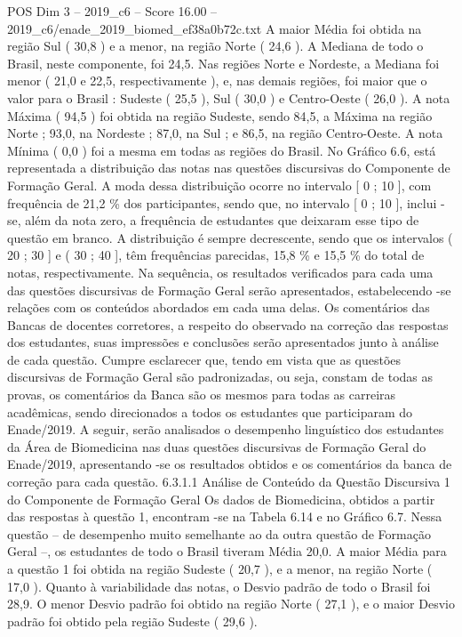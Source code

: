 \begin{textsample}{POS Dim 3 – 2019\_c6 – Score 16.00 – 2019\_c6/enade\_2019\_biomed\_ef38a0b72c.txt}
A maior Média foi obtida na região Sul ( 30,8 ) e a menor, na região Norte ( 24,6 ).
A Mediana de todo o Brasil, neste componente, foi 24,5.
Nas regiões Norte e Nordeste, a Mediana foi menor ( 21,0 e 22,5, respectivamente ), e, nas demais regiões, foi maior que o valor para o Brasil : Sudeste ( 25,5 ), Sul ( 30,0 ) e Centro-Oeste ( 26,0 ).
A nota Máxima ( 94,5 ) foi obtida na região Sudeste, sendo 84,5, a Máxima na região Norte ; 93,0, na Nordeste ; 87,0, na Sul ; e 86,5, na região Centro-Oeste.
A nota Mínima ( 0,0 ) foi a mesma em todas as regiões do Brasil.
No Gráfico 6.6, está representada a distribuição das notas nas questões discursivas do Componente de Formação Geral.
A moda dessa distribuição ocorre no intervalo [ 0 ; 10 ], com frequência de 21,2 \% dos participantes, sendo que, no intervalo [ 0 ; 10 ], inclui -se, além da nota zero, a frequência de estudantes que deixaram esse tipo de questão em branco.
A distribuição é sempre decrescente, sendo que os intervalos ( 20 ; 30 ] e ( 30 ; 40 ], têm frequências parecidas, 15,8 \% e 15,5 \% do total de notas, respectivamente.
Na sequência, os resultados verificados para cada uma das questões discursivas de Formação Geral serão apresentados, estabelecendo -se relações com os conteúdos abordados em cada uma delas.
Os comentários das Bancas de docentes corretores, a respeito do observado na correção das respostas dos estudantes, suas impressões e conclusões serão apresentados junto à análise de cada questão.
Cumpre esclarecer que, tendo em vista que as questões discursivas de Formação Geral são padronizadas, ou seja, constam de todas as provas, os comentários da Banca são os mesmos para todas as carreiras acadêmicas, sendo direcionados a todos os estudantes que participaram do Enade/2019.
A seguir, serão analisados o desempenho linguístico dos estudantes da Área de Biomedicina nas duas questões discursivas de Formação Geral do Enade/2019, apresentando -se os resultados obtidos e os comentários da banca de correção para cada questão. 6.3.1.1 Análise de Conteúdo da Questão Discursiva 1 do Componente de Formação Geral Os dados de Biomedicina, obtidos a partir das respostas à questão 1, encontram -se na Tabela 6.14 e no Gráfico 6.7.
Nessa questão – de desempenho muito semelhante ao da outra questão de Formação Geral –, os estudantes de todo o Brasil tiveram Média 20,0.
A maior Média para a questão 1 foi obtida na região Sudeste ( 20,7 ), e a menor, na região Norte ( 17,0 ).
Quanto à variabilidade das notas, o Desvio padrão de todo o Brasil foi 28,9.
O menor Desvio padrão foi obtido na região Norte ( 27,1 ), e o maior Desvio padrão foi obtido pela região Sudeste ( 29,6 ).

\end{textsample}
